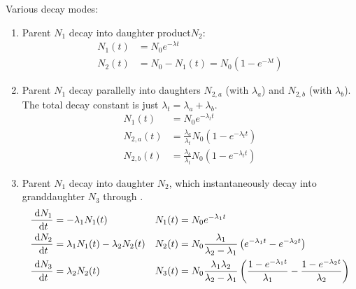 \documentclass{school-22.101-notes}
\begin{document}
Various decay modes: 
\begin{enumerate}
\item Parent $N_1$ decay into daughter product$N_2$: 
\begin{align}
N_1 (t) &= N_0 e^{-\lambda t} \\
N_2 (t) &= N_0 - N_1 (t) = N_0 (1 - e^{-\lambda t}) 
\end{align}

\item Parent $N_1$ decay parallelly into daughters $N_{2,a}$ (with $\lambda_a$) and $N_{2,b}$ (with $\lambda_b$). The total decay constant is just $\lambda_t = \lambda_a + \lambda_b$. 
\begin{align}
N_1 (t) &= N_0 e^{-\lambda_t t} \\
N_{2,a} (t) &= \frac{\lambda_a}{\lambda_t} N_0 (1 - e^{-\lambda_t t}) \\
N_{2,b} (t) &= \frac{\lambda_b}{\lambda_t} N_0 (1 - e^{-\lambda_t t})
\end{align}

\item Parent $N_1$ decay into daughter $N_2$, which instantaneously decay into granddaughter $N_3$ through .
\begin{align}
\frac{\mbox{ }\mathrm{d} N_1}{\mbox{ }\mathrm{d} t} &= -\lambda_1 N_1 (t)   & N_1 (t) &= N_{0} e^{-\lambda_1 t} \\
\frac{\mbox{ }\mathrm{d} N_2}{\mbox{ }\mathrm{d} t} &= \lambda_1 N_1 (t) - \lambda_2 N_2(t)   & N_2 (t) &= N_{0} \frac{\lambda_1}{\lambda_2 - \lambda_1} \left( e^{-\lambda_1 t} - e^{-\lambda_2 t} \right) \\
\frac{\mbox{ }\mathrm{d} N_3}{\mbox{ }\mathrm{d} t} &= \lambda_2 N_2 (t)    & N_3 (t) &= N_{0} \frac{\lambda_1 \lambda_2}{\lambda_2 - \lambda_1} \left( \frac{1 - e^{-\lambda_1 t} }{\lambda_1} - \frac{1- e^{-\lambda_2 t}}{\lambda_2} \right) 
\end{align}
\end{enumerate}
\end{document}
